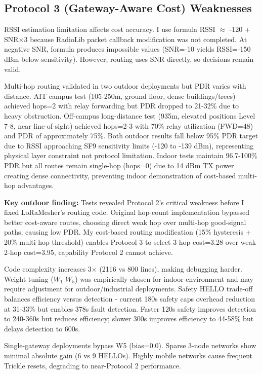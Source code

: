 \subsection{Protocol 3 (Gateway-Aware Cost) Weaknesses}

RSSI estimation limitation affects cost accuracy. I use formula RSSI $\approx$ -120 + SNR$\times$3 because RadioLib packet callback modification was not completed. At negative SNR, formula produces impossible values (SNR=-10 yields RSSI=-150 dBm below sensitivity). However, routing uses SNR directly, so decisions remain valid.

Multi-hop routing validated in two outdoor deployments but PDR varies with distance. AIT campus test (105-250m, ground floor, dense buildings/trees) achieved hops=2 with relay forwarding but PDR dropped to 21-32\% due to heavy obstruction. Off-campus long-distance test (935m, elevated positions Level 7-8, near line-of-sight) achieved hops=2-3 with 70\% relay utilization (FWD=48) and PDR of approximately 75\%. Both outdoor results fall below 95\% PDR target due to RSSI approaching SF9 sensitivity limits (-120 to -139 dBm), representing physical layer constraint not protocol limitation. Indoor tests maintain 96.7-100\% PDR but all routes remain single-hop (hops=0) due to 14 dBm TX power creating dense connectivity, preventing indoor demonstration of cost-based multi-hop advantages.

\textbf{Key outdoor finding:} Tests revealed Protocol 2's critical weakness before I fixed LoRaMesher's routing code. Original hop-count implementation bypassed better cost-aware routes, choosing direct weak hop over multi-hop good-signal paths, causing low PDR. My cost-based routing modification (15\% hysteresis + 20\% multi-hop threshold) enables Protocol 3 to select 3-hop cost=3.28 over weak 2-hop cost=3.95, capability Protocol 2 cannot achieve.

Code complexity increases 3$\times$ (2116 vs 800 lines), making debugging harder. Weight tuning ($W_1$-$W_5$) was empirically chosen for indoor environment and may require adjustment for outdoor/industrial deployments. Safety HELLO trade-off balances efficiency versus detection - current 180s safety caps overhead reduction at 31-33\% but enables 378s fault detection. Faster 120s safety improves detection to 240-360s but reduces efficiency; slower 300s improves efficiency to 44-58\% but delays detection to 600s.

Single-gateway deployments bypass W5 (bias=0.0). Sparse 3-node networks show minimal absolute gain (6 vs 9 HELLOs). Highly mobile networks cause frequent Trickle resets, degrading to near-Protocol 2 performance.

